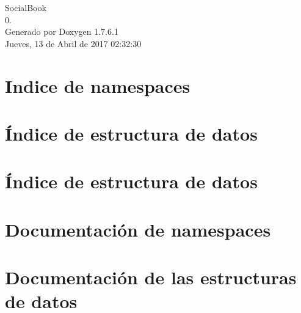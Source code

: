 \documentclass[a4paper]{book}
\begin{document}
\hypersetup{pageanchor=false,citecolor=blue}
\begin{titlepage}
\vspace*{7cm}
\begin{center}
{\Large \-Social\-Book \\[1ex]\large 0. }\\
\vspace*{1cm}
{\large \-Generado por Doxygen 1.7.6.1}\\
\vspace*{0.5cm}
{\small Jueves, 13 de Abril de 2017 02:32:30}\\
\end{center}
\end{titlepage}
\clearemptydoublepage
{}
\tableofcontents
\clearemptydoublepage
{}
\hypersetup{pageanchor=true,citecolor=blue}
\chapter{\-Indice de namespaces}

\chapter{Índice de estructura de datos}

\chapter{Índice de estructura de datos}

\chapter{\-Documentación de namespaces}

\chapter{\-Documentación de las estructuras de datos}

























\printindex
\end{document}
